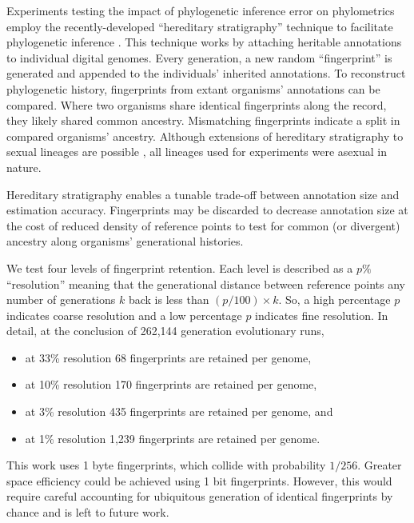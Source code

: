 Experiments testing the impact of phylogenetic inference error on phylometrics employ the recently-developed ``hereditary stratigraphy'' technique to facilitate phylogenetic inference \citep{moreno2022hstrat}.
This technique works by attaching heritable annotations to individual digital genomes.
Every generation, a new random ``fingerprint'' is generated and appended to the individuals' inherited annotations.
To reconstruct phylogenetic history, fingerprints from extant organisms' annotations can be compared.
Where two organisms share identical fingerprints along the record, they likely shared common ancestry.
Mismatching fingerprints indicate a split in compared organisms' ancestry.
Although extensions of hereditary stratigraphy to sexual lineages are possible \citep{moreno2024methods}, all lineages used for experiments were asexual in nature.

Hereditary stratigraphy enables a tunable trade-off between annotation size and estimation accuracy.
Fingerprints may be discarded to decrease annotation size at the cost of reduced density of reference points to test for common (or divergent) ancestry along organisms' generational histories.

We test four levels of fingerprint retention.
Each level is described as a $p\%$ ``resolution'' meaning that the generational distance between reference points any number of generations $k$ back is less than $(p / 100) \times k$.
So, a high percentage $p$ indicates coarse resolution and a low percentage $p$ indicates fine resolution.
In detail, at the conclusion of 262,144 generation evolutionary runs,
\begin{itemize}
  \item at 33\% resolution 68 fingerprints are retained per genome,
  \item at 10\% resolution 170 fingerprints are retained per genome,
  \item at 3\% resolution 435 fingerprints are retained per genome, and
  \item at 1\% resolution 1,239 fingerprints are retained per genome.
\end{itemize}

This work uses 1 byte fingerprints, which collide with probability $1/256$.
Greater space efficiency could be achieved using 1 bit fingerprints.
However, this would require careful accounting for ubiquitous generation of identical fingerprints by chance and is left to future work.

